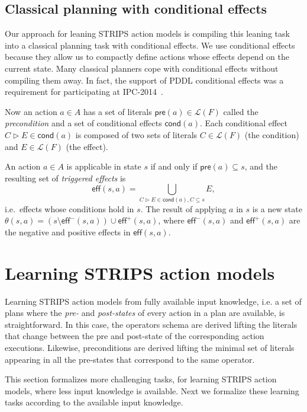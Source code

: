 \documentclass[letterpaper]{article} %
\newcommand{\pre}{\mathsf{pre}}     %
\newcommand{\eff}{\mathsf{eff}}     %
\newcommand{\cond}{\mathsf{cond}}   %
\begin{document}
\subsection{Classical planning with conditional effects}
Our approach for leaning STRIPS action models is compiling this leaning task into a classical planning task with conditional effects. We use conditional effects because they allow us to compactly define actions whose effects depend on the current state. Many classical planners cope with conditional effects without compiling them away. In fact, the support of PDDL conditional effects was a requirement for participating at IPC-2014~\cite{vallati:IPC:AIM2015}.

Now an action $a\in A$ has a set of literals $\pre(a)\in\mathcal{L}(F)$ called the {\em precondition} and a set of conditional effects $\cond(a)$. Each conditional effect $C\rhd E\in\cond(a)$ is composed of two sets of literals $C\in\mathcal{L}(F)$ (the condition) and $E\in\mathcal{L}(F)$ (the effect).

An action $a\in A$ is applicable in state $s$ if and only if $\pre(a)\subseteq s$, and the resulting set of {\em triggered effects} is
\[
\eff(s,a)=\bigcup_{C\rhd E\in\cond(a),C\subseteq s} E,
\]
i.e.~effects whose conditions hold in $s$. The result of applying $a$ in $s$ is a new state $\theta(s,a)=(s\setminus \eff^-(s,a))\cup\eff^+(s,a)$, where $\eff^-(s,a)$ and $\eff^+(s,a)$ are the negative and positive effects in $\eff(s,a)$.


\section{Learning STRIPS action models}
Learning STRIPS action models from fully available input knowledge, i.e. a set of plans where the {\em pre-} and {\em post-states} of every action in a plan are available, is straightforward. In this case, the operators schema are derived lifting the literals that change between the pre and post-state of the corresponding action executions. Likewise, preconditions are derived lifting the minimal set of literals appearing in all the pre-states that correspond to the same operator.

This section formalizes more challenging tasks, for learning STRIPS action models, where less input knowledge is available. Next we formalize these learning tasks according to the available input knowledge.
\end{document}
